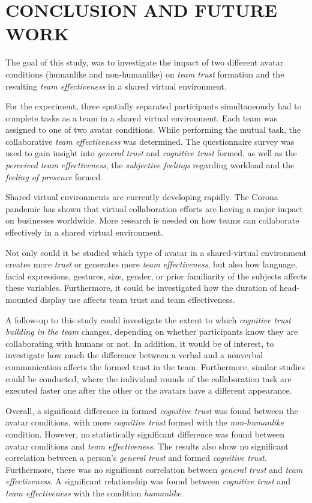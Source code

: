 \documentclass[sigchi]{acmart}
\begin{document}
\section{CONCLUSION AND FUTURE WORK}
The goal of this study, was to investigate the impact of two different avatar conditions (humanlike and non-humanlike) on \textit{team trust} formation and the resulting \textit{team effectiveness} in a shared virtual environment. 

For the experiment, three spatially separated participants simultaneously had to complete tasks as a team in a shared virtual environment. Each team was assigned to one of two avatar conditions. While performing the mutual task, the collaborative \textit{team effectiveness} was determined. The questionnaire survey was used to gain insight into \textit{general trust} and \textit{cognitive trust} formed, as well as the \textit{perceived team effectiveness}, the \textit{subjective feelings} regarding workload and the \textit{feeling of presence} formed.

Shared virtual environments are currently developing rapidly. The Corona pandemic has shown that virtual collaboration efforts are having a major impact on businesses worldwide. More research is needed on how teams can collaborate effectively in a shared virtual environment.

Not only could it be studied which type of avatar in a shared-virtual environment creates more \textit{trust} or generates more \textit{team effectiveness}, but also how language, facial expressions, gestures, size, gender, or prior familiarity of the subjects affects these variables.
Furthermore, it could be investigated how the duration of head-mounted display use affects team trust and team effectiveness.

A follow-up to this study could investigate the extent to which \textit{cognitive trust building in the team} changes, depending on whether participants know they are collaborating with humans or not. In addition, it would be of interest, to investigate how much the difference between a verbal and a nonverbal communication affects the formed trust in the team.  
Furthermore, similar studies could be conducted, where the individual rounds of the collaboration task are executed faster one after the other or the avatars have a different appearance.

Overall, a significant difference in formed \textit{cognitive trust} was found between the avatar conditions, with more \textit{cognitive trust} formed with the \textit{non-humanlike} condition. However, no statistically significant difference was found between avatar conditions and \textit{team effectiveness}. The results also show no significant correlation between a person's \textit{general trust} and formed \textit{cognitive trust}. Furthermore, there was no significant correlation between \textit{general trust} and \textit{team effectiveness}. A significant relationship was found between \textit{cognitive trust} and \textit{team effectiveness} with the condition \textit{humanlike}.
\end{document}

